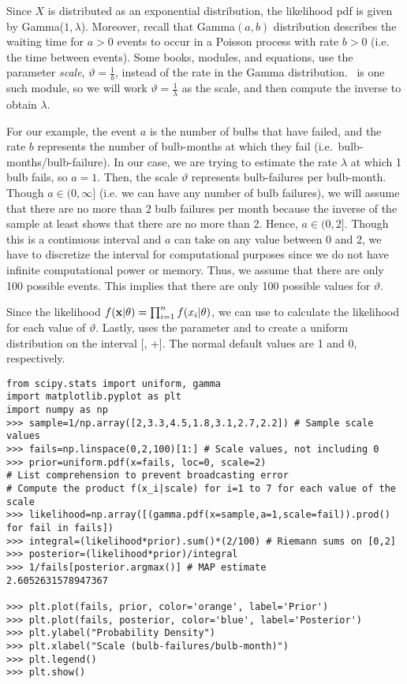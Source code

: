 Since $X$ is distributed as an exponential distribution, the likelihood pdf is given by Gamma($1,\lambda$).
Moreover, recall that Gamma$(a,b)$ distribution describes the waiting time for $a>0$ events to occur in a Poisson process with rate $b>0$ (i.e. the time between events).
Some books, modules, and equations, use the parameter \emph{scale}, $\vartheta=\frac{1}{b}$, instead of the rate in the Gamma distribution.\
 is one such module, so we will work $\vartheta=\frac{1}{\lambda}$ as the scale, and then compute the inverse to obtain $\lambda$.

For our example, the event $a$ is the number of bulbs that have failed, and the rate $b$ represents the number of bulb-months at which they fail (i.e.\ bulb-months/bulb-failure).
In our case, we are trying to estimate the rate $\lambda$ at which 1 bulb fails, so $a=1$.
Then, the scale $\vartheta$ represents bulb-failures per bulb-month.
Though $a \in(0,\infty]$ (i.e. we can have any number of bulb failures), we will assume that there are no more than 2 bulb failures per month because the inverse of the sample at least shows that there are no more than 2.
Hence, $a \in(0,2]$.
Though this is a continuous interval and $a$ can take on any value between 0 and 2, we have to discretize the interval for computational purposes since we do not have infinite computational power or memory.
Thus, we assume that there are only 100 possible events.
This implies that there are only 100 possible values for $\vartheta$.

Since the likelihood $f(\mathbf{x}| \theta)=\prod_{i=1}^{n}f(x_i| \theta)$, we can use  to calculate the likelihood for each value of $\vartheta$.
Lastly, \li{scipy.stats.uniform} uses the parameter \li{loc} and  to create a uniform distribution on the interval [\li{loc}, \li{loc}+\li{scale}].
The normal default values are 1 and 0, respectively.

\begin{lstlisting}
from scipy.stats import uniform, gamma
import matplotlib.pyplot as plt
import numpy as np
>>> sample=1/np.array([2,3.3,4.5,1.8,3.1,2.7,2.2]) # Sample scale values
>>> fails=np.linspace(0,2,100)[1:] # Scale values, not including 0
>>> prior=uniform.pdf(x=fails, loc=0, scale=2)
# List comprehension to prevent broadcasting error
# Compute the product f(x_i|scale) for i=1 to 7 for each value of the scale
>>> likelihood=np.array([(gamma.pdf(x=sample,a=1,scale=fail)).prod() for fail in fails])
>>> integral=(likelihood*prior).sum()*(2/100) # Riemann sums on [0,2]
>>> posterior=(likelihood*prior)/integral
>>> 1/fails[posterior.argmax()] # MAP estimate
2.6052631578947367

>>> plt.plot(fails, prior, color='orange', label='Prior')
>>> plt.plot(fails, posterior, color='blue', label='Posterior')
>>> plt.ylabel("Probability Density")
>>> plt.xlabel("Scale (bulb-failures/bulb-month)")
>>> plt.legend()
>>> plt.show()
\end{lstlisting}

